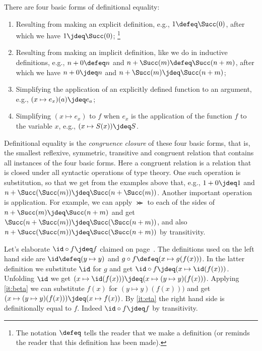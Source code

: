 There are four basic forms of definitional equality:
\begin{enumerate}
\item\label{it:exp-defeq} Resulting from making an explicit definition, 
e.g., $1 \defeq \Succ(0)$, after which we have $1 \jdeq \Succ(0)$;%
\footnote{The notation $\defeq$ tells the reader that we make a definition
(or reminds the reader that this definition has been made).}

\item\label{it:imp-defeq} Resulting from making an implicit definition, 
like we do in inductive definitions,
e.g., $n+0 \defeq n$ and $n+\Succ(m) \defeq \Succ(n+m)$,
after which we have $n+0 \jdeq n$ and $n+\Succ(m) \jdeq \Succ(n+m)$;

\item\label{it:beta} Simplifying the application of an explicitly defined 
function to an argument, e.g., $(x \mapsto e_x)(a) \jdeq e_a$;

\item\label{it:eta} Simplifying $(x \mapsto e_x)$ to $f$ when $e_x$
is the application of the function $f$ to the variable $x$,
e.g., $(x \mapsto S(x)) \jdeq S$.
\end{enumerate}

Definitional equality is the \emph{congruence closure} of these 
four basic forms, that is, the smallest reflexive, symmetric, transitive
and congruent relation that contains all instances of the four basic forms.
Here a congruent relation is a relation that is closed under all syntactic
operations of type theory. One such operation is substitution, so that we
get from the examples above that, e.g., $1+0 \jdeq 1$ 
and $n+\Succ(\Succ(m)) \jdeq \Succ(n+\Succ(m))$. Another important
operation is application. For example, we can apply $\Succ$ to each of
the sides of $n+\Succ(m) \jdeq \Succ(n+m)$ and get 
$\Succ(n+\Succ(m)) \jdeq \Succ(\Succ(n+m))$, and also
$n+\Succ(\Succ(m)) \jdeq \Succ(\Succ(n+m))$ by transitivity.

Let's elaborate $\id \circ f \jdeq f$ claimed on page~\pageref{page:idofetaf}.
The definitions used on the left hand side are 
$\id \defeq (y \mapsto y)$ and $g \circ f \defeq (x \mapsto g(f(x)))$.
In the latter definition we substitute $\id$ for $g$ and get
$\id \circ f \jdeq (x \mapsto \id(f(x)))$. Unfolding $\id$ we get
$(x \mapsto \id(f(x))) \jdeq (x \mapsto (y\mapsto y)(f(x)))$.
Applying \ref{it:beta} we can substitute $f(x)$ for $(y\mapsto y)(f(x)))$
and get $(x \mapsto (y\mapsto y)(f(x))) \jdeq (x \mapsto f(x))$.
By \ref{it:eta} the right hand side is definitionally equal to $f$.
Indeed $\id \circ f \jdeq f$ by transitivity.

